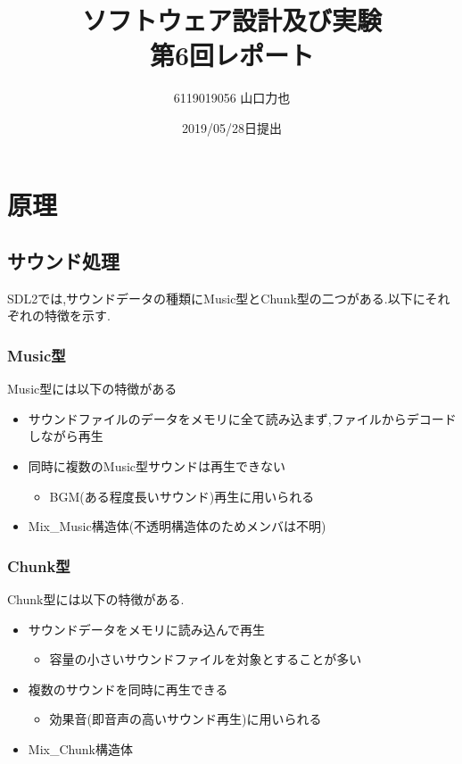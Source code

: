 \documentclass{jarticle}
\title{ソフトウェア設計及び実験\\
	第6回レポート}
\author{6119019056 山口力也}
\date{2019/05/28日提出}
\begin{document}
	\maketitle
	\section{原理}
	\subsection{サウンド処理}
	SDL2では,サウンドデータの種類にMusic型とChunk型の二つがある.以下にそれぞれの特徴を示す.
	\subsubsection{Music型}
	Music型には以下の特徴がある
	\begin{itemize}
	
	\item サウンドファイルのデータをメモリに全て読み込まず,ファイルからデコードしながら再生
	\item 同時に複数のMusic型サウンドは再生できない
		\begin{itemize}
		\item BGM(ある程度長いサウンド)再生に用いられる
		\end{itemize}
	\item Mix\_Music構造体(不透明構造体のためメンバは不明)
	\end{itemize}

	\subsubsection{Chunk型}
	Chunk型には以下の特徴がある.
	\begin{itemize}

	\item サウンドデータをメモリに読み込んで再生
		\begin{itemize} 
		\item 容量の小さいサウンドファイルを対象とすることが多い
		\end{itemize}
	\item 複数のサウンドを同時に再生できる
		\begin{itemize} 
		\item 効果音(即音声の高いサウンド再生)に用いられる
		\end{itemize}
	\item Mix\_Chunk構造体
	
	\end{itemize}
\end{document}
